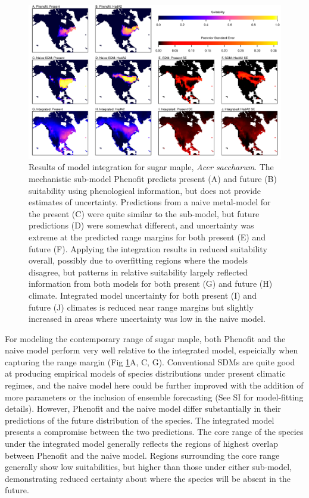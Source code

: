 \begin{figure}[tb]
	\includegraphics[width=6in]{ex2.pdf}
	\caption{Results of model integration for sugar maple, \emph{Acer saccharum}.
	The mechanistic sub-model Phenofit predicts present (A) and future (B) suitability using phenological information, but does not provide estimates of uncertainty.
	Predictions from a naive metal-model for the present (C) were quite similar to the sub-model, but future predictions (D) were somewhat different, and uncertainty was extreme at the predicted range margins for both present (E) and future (F).
	Applying the integration results in reduced suitability overall, possibly due to overfitting regions where the models disagree, but patterns in relative suitability largely reflected information from both models for both present (G) and future (H) climate.
	Integrated model uncertainty for both present (I) and future (J) climates is reduced near range margins but slightly increased in areas where uncertainty was low in the naive model.
	}
	\label{fig:ex2}
\end{figure}
%

For modeling the contemporary range of sugar maple, both Phenofit and the naive model perform very well relative to the integrated model, espeicially when capturing the range margin (Fig \ref{fig:ex2}A, C, G).
Conventional SDMs are quite good at producing empirical models of species distributions under present climatic regimes, and the naive model here could be further improved with the addition of more parameters or the inclusion of ensemble forecasting (See SI for model-fitting details).
However, Phenofit and the naive model differ substantially in their predictions of the future distribution of the species.
The integrated model presents a compromise between the two predictions. 
The core range of the species under the integrated model generally reflects the regions of highest overlap between Phenofit and the naive model.
Regions surrounding the core range generally show low suitabilities, but higher than those under either sub-model, demonstrating reduced certainty about where the species will be absent in the future.


